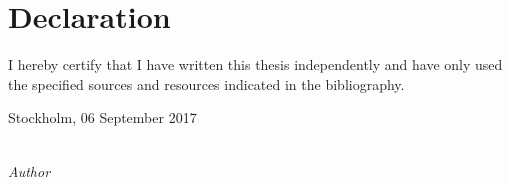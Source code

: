 \clearpage
\pagestyle{empty}
\renewcommand*{\chapterpagestyle}{empty}
\chapter*{Declaration}




\vspace*{2cm}
\noindent

I hereby certify that I have written this thesis independently and have only used the specified sources and resources indicated in the bibliography.

\vspace{2cm}

\noindent
Stockholm, 06 September 2017 %

\vspace{3cm}

\hspace*{7cm}%
\dotfill\\
\hspace*{8.5cm}%
\textit{Author}
